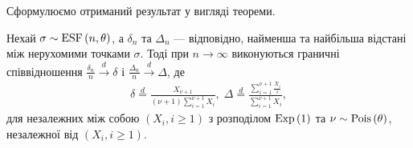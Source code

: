 Сформулюємо отриманий результат у вигляді теореми.
\begin{theorem}\label{th:spacing_limit}
    Нехай $\sigma \sim \mathrm{ESF}\left(n, \theta\right)$, а $\delta_n$ та $\Delta_n$ ---
    відповідно, найменша та найбільша відстані між нерухомими точками $\sigma$.
    Тоді при $n\to\infty$ виконуються граничні
    співвідношення
    $\frac{\delta_n}{n} \overset{d}{\longrightarrow} \delta$ і 
    $\frac{\Delta_n}{n} \overset{d}{\longrightarrow} \Delta$, де
    \begin{gather}
        \delta \overset{d}{=}
        \frac{X_{\nu+1}}{(\nu+1)\sum_{i=1}^{\nu+1} X_i}, \;
        \Delta \overset{d}{=} 
        \frac{\sum_{i=1}^{\nu+1} \frac{X_i}{i}}{\sum_{i=1}^{\nu+1} X_i},
    \end{gather}
    для незалежних між собою $\left(X_i, i \geq 1\right)$
    з розподілом $\mathrm{Exp}\left(1\right)$ та $\nu \sim \mathrm{Pois}\left(\theta\right)$,
    незалежної від $\left(X_i, i \geq 1\right)$.
\end{theorem}